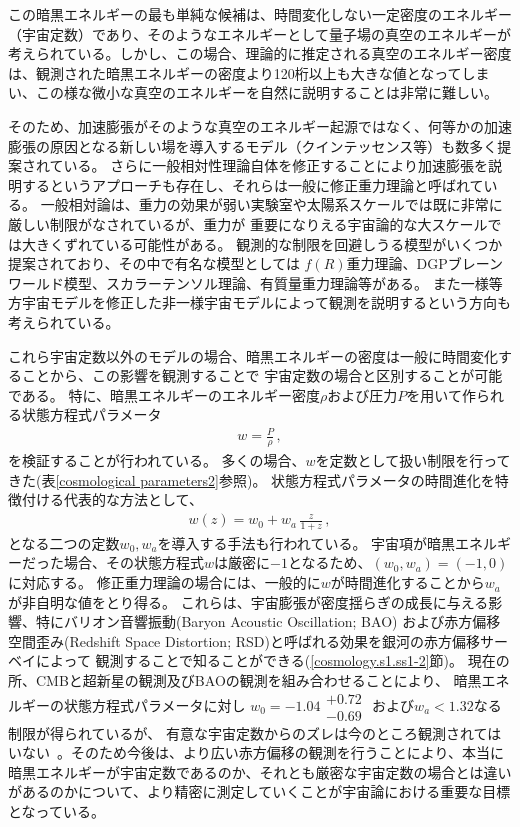 この暗黒エネルギーの最も単純な候補は、時間変化しない一定密度のエネルギー（宇宙定数）であり、そのようなエネルギーとして量子場の真空のエネルギーが考えられている。しかし、この場合、理論的に推定される真空のエネルギー密度は、観測された暗黒エネルギーの密度より120桁以上も大きな値となってしまい、この様な微小な真空のエネルギーを自然に説明することは非常に難しい。

そのため、加速膨張がそのような真空のエネルギー起源ではなく、何等かの加速膨張の原因となる新しい場を導入するモデル（クインテッセンス等）も数多く提案されている。
さらに一般相対性理論自体を修正することにより加速膨張を説明するというアプローチも存在し、それらは一般に修正重力理論と呼ばれている。
一般相対論は、重力の効果が弱い実験室や太陽系スケールでは既に非常に厳しい制限がなされているが、重力が
重要になりえる宇宙論的な大スケールでは大きくずれている可能性がある。
観測的な制限を回避しうる模型がいくつか提案されており、その中で有名な模型としては
$f(R)$重力理論、DGPブレーンワールド模型、スカラーテンソル理論、有質量重力理論等がある。
また一様等方宇宙モデルを修正した非一様宇宙モデルによって観測を説明するという方向も考えられている。

これら宇宙定数以外のモデルの場合、暗黒エネルギーの密度は一般に時間変化することから、この影響を観測することで
宇宙定数の場合と区別することが可能である。
特に、暗黒エネルギーのエネルギー密度$\rho$および圧力$P$を用いて作られる状態方程式パラメータ
\begin{align}
	w=\frac{P}{\rho}\,,
	\label{eq:DE EOS def}
\end{align}
を検証することが行われている。
多くの場合、$w$を定数として扱い制限を行ってきた(表\ref{cosmological parameters2}参照)。
状態方程式パラメータの時間進化を特徴付ける代表的な方法として、
\begin{align}
	w(z)=w_0+w_a\,\frac{z}{1+z}
	\,,
	\label{eq:DE EOS}
\end{align}
となる二つの定数$w_0,w_a$を導入する手法も行われている。
宇宙項が暗黒エネルギーだった場合、その状態方程式$w$は厳密に$-1$となるため、$(w_0,w_a)=(-1,0)$に対応する。
修正重力理論の場合には、一般的に$w$が時間進化することから$w_a$が非自明な値をとり得る。
これらは、宇宙膨張が密度揺らぎの成長に与える影響、特にバリオン音響振動(Baryon Acoustic Oscillation; BAO)
および赤方偏移空間歪み(Redshift Space Distortion; RSD)と呼ばれる効果を銀河の赤方偏移サーベイによって
観測することで知ることができる(\ref{cosmology.s1.ss1-2}節)。
現在の所、CMBと超新星の観測及びBAOの観測を組み合わせることにより、
暗黒エネルギーの状態方程式パラメータに対し
$w_0=-1.04
   \begin{array}{l}
      +0.72 \\
      -0.69
	\end{array}$
および$w_a<1.32$なる制限が得られているが、
有意な宇宙定数からのズレは今のところ観測されてはいない~\citep{Ade:2013zuv}。そのため今後は、より広い赤方偏移の観測を行うことにより、本当に暗黒エネルギーが宇宙定数であるのか、それとも厳密な宇宙定数の場合とは違いがあるのかについて、より精密に測定していくことが宇宙論における重要な目標となっている。


